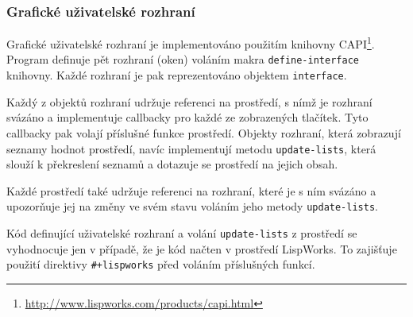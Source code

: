 \subsubsection{Grafické uživatelské rozhraní}
Grafické uživatelské rozhraní je implementováno použitím knihovny
CAPI\footnote{\url{http://www.lispworks.com/products/capi.html}}. Program
definuje pět rozhraní (oken) voláním makra \verb|define-interface| knihovny.
Každé rozhraní je pak reprezentováno objektem \verb|interface|.

Každý z objektů rozhraní udržuje referenci na prostředí, s nímž je rozhraní
svázáno a implementuje callbacky pro každé ze zobrazených tlačítek. Tyto
callbacky pak volají příslušné funkce prostředí. Objekty rozhraní, která
zobrazují seznamy hodnot prostředí, navíc implementují metodu
\verb|update-lists|, která slouží k překreslení seznamů a dotazuje se prostředí
na jejich obsah.

Každé prostředí také udržuje referenci na rozhraní, které je s ním svázáno a
upozorňuje jej na změny ve svém stavu voláním jeho metody \verb|update-lists|.

Kód definující uživatelské rozhraní a volání \verb|update-lists| z prostředí se
vyhodnocuje jen v případě, že je kód načten v prostředí LispWorks. To zajišťuje
použití direktivy \verb|#+lispworks| před voláním příslušných funkcí.
